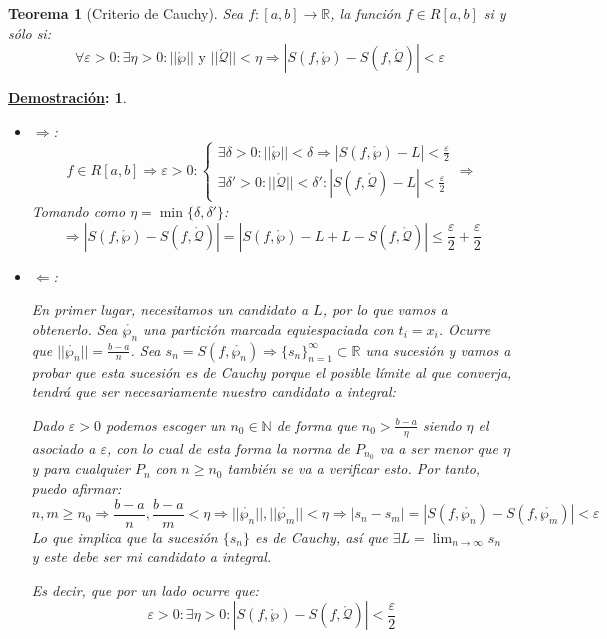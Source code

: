 \documentclass[10pt,a4paper,openright]{book}
\theoremstyle{break}
\newtheorem*{theo}{Teorema}
\newtheorem*{demo}{\underline{Demostración}:}
\begin{document}
\begin{theo}[Criterio de Cauchy]
Sea $f:[a,b]\rightarrow \mathbb R$, la función $f\in R[a,b]$ si y sólo si:
$$\forall \varepsilon > 0: \exists \eta > 0 : ||\mathring{\wp}|| \mbox{ y } ||\mathring{\mathcal{Q}}|| < \eta \Rightarrow \left| S(f,\mathring{\wp})- S(f, \mathring{\mathcal{Q}})\right| < \varepsilon $$
\end{theo}
\begin{demo}
\begin{itemize}
\item $\Rightarrow$:
$$f\in R[a,b]\Rightarrow \varepsilon >0 : \begin{cases}\exists \delta >0: ||\mathring{\wp}|| < \delta \Rightarrow |S(f,\mathring{\wp})-L| < \frac{\varepsilon}{2} \\ \exists \delta'>0: ||\mathring{\mathcal{Q}}||< \delta': |S(f, \mathring{\mathcal{Q}})-L|< \frac{\varepsilon}{2} \end{cases}\Rightarrow$$
Tomando como $\eta = \min\{\delta, \delta'\}$:
$$\Rightarrow |S(f,\mathring{\wp})-S(f,\mathring{\mathcal{Q}})|= |S(f,\mathring{\wp})-L+L-S(f,\mathring{\mathcal{Q}})| \leq \frac{\varepsilon}{2}+\frac{\varepsilon}{2}$$

\item $\Leftarrow$:

En primer lugar, necesitamos un candidato a $L$, por lo que vamos a obtenerlo. Sea $\mathring{\wp_n}$ una partición marcada equiespaciada con $t_i=x_i$. Ocurre que $||\mathring{\wp_n}||=\frac{b-a}{n}$. Sea $s_n=S(f,\mathring{\wp_n})\Rightarrow \{s_n\}_{n=1}^\infty \subset \mathbb R$ una sucesión y vamos a probar que esta sucesión es de Cauchy porque el posible límite al que converja, tendrá que ser necesariamente nuestro candidato a integral:

Dado $\varepsilon >0$ podemos escoger un $n_0\in \mathbb N$ de forma que $n_0> \frac{b-a}{\eta}$ siendo $\eta$ el asociado a $\varepsilon$, con lo cual de esta forma la norma de $P_{n_0}$ va a ser menor que $\eta$ y para cualquier $P_{n}$ con $n\geq n_0$ también se va a verificar esto. Por tanto, puedo afirmar:
$$n,m\geq n_0\Rightarrow \frac{b-a}{n}, \frac{b-a}{m}<\eta\Rightarrow ||\mathring{\wp_n}||,||\mathring{\wp_m}||<\eta\Rightarrow |s_n-s_m|=|S(f,\mathring{\wp_n})-S(f,\mathring{\wp_m})|<\varepsilon$$
Lo que implica que la sucesión $\{s_n\}$ es de Cauchy, así que $\exists L = \lim_{n\rightarrow \infty} s_n$ y este debe ser mi candidato a integral.

Es decir, que por un lado ocurre que:
$$\varepsilon > 0 : \exists \eta >0: |S(f,\mathring{\wp})-S(f, \mathring{\mathcal{Q}})|<\frac{\varepsilon}{2}$$


\end{itemize}
\end{demo}
\end{document}
